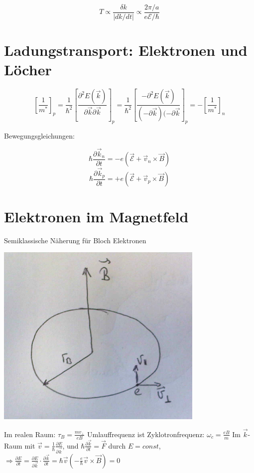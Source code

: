 \[T\propto \frac{\delta k}{|dk/dt|}\propto \frac{2\pi/a}{e\mathcal E/\hbar}\]


\section{Ladungstransport: Elektronen und Löcher}

\[\left[\frac{1}{m^*}\right]_{p}=\frac{1}{\hbar^2}\left[\frac{\partial^2 E(\vec k)}{\partial \vec k\partial \vec k}\right]_{p}=\frac{1}{\hbar^2}\left[\frac{-\partial^2 E(\vec k)}{(-\partial \vec k)(-\partial \vec k}\right]_{p} = -\left[\frac{1}{m^*}\right]_n \]


Bewegungsgleichungen: 

\[\hbar \frac{\partial \vec k_n}{\partial t} = -e(\mathcal{\vec E} + \vec v_n\times\vec B)\]
\[\hbar \frac{\partial \vec k_p}{\partial t} = +e(\mathcal {\vec E} + \vec v_p\times\vec B)\]


\section{Elektronen im Magnetfeld}

Semiklassische Näherung für Bloch Elektronen

\includegraphics[width=0.75\textwidth]{kap10_04.png}

Im realen Raum: \(\tau_B = \frac{m v_\bot}{eB}\)
Umlauffrequenz ist Zyklotronfrequenz: \(\omega_c = \frac{eB}{m}\)
Im \(\vec k\)-Raum mit \(\vec v = \frac{1}{\hbar }\frac{\partial E}{\partial \vec k}\), und \(\hbar \frac{\partial \vec k}{\partial t} = \vec F\)
durch \(E=const\), \(\Rightarrow \frac{\partial E}{\partial t} = \frac{\partial E}{\partial \vec k}\cdot\frac{\partial \vec k}{\partial t} = \hbar\vec v ( - \frac{e}{\hbar}\vec v \times\vec B) = 0\)

